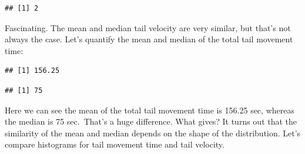 \documentclass[
]{book}
\newenvironment{Shaded}{\begin{snugshade}}{\end{snugshade}}
\newcommand{\AttributeTok}[1]{\textcolor[rgb]{0.13,0.29,0.53}{#1}}
\newcommand{\DecValTok}[1]{\textcolor[rgb]{0.00,0.00,0.81}{#1}}
\newcommand{\FunctionTok}[1]{\textcolor[rgb]{0.13,0.29,0.53}{\textbf{#1}}}
\newcommand{\NormalTok}[1]{#1}
\newcommand{\SpecialCharTok}[1]{\textcolor[rgb]{0.81,0.36,0.00}{\textbf{#1}}}
\newcommand{\StringTok}[1]{\textcolor[rgb]{0.31,0.60,0.02}{#1}}
\begin{document}
\begin{Shaded}
\end{Shaded}

\begin{verbatim}
## [1] 2
\end{verbatim}

Fascinating. The mean and median tail velocity are very similar, but that's not always the case. Let's quantify the mean and median of the total tail movement time:

\begin{Shaded}
\end{Shaded}

\begin{verbatim}
## [1] 156.25
\end{verbatim}

\begin{Shaded}
\end{Shaded}

\begin{verbatim}
## [1] 75
\end{verbatim}

Here we can see the mean of the total tail movement time is 156.25 sec, whereas the median is 75 sec.~That's a huge difference. What gives? It turns out that the similarity of the mean and median depends on the shape of the distribution. Let's compare histograms for tail movement time and tail velocity.

\begin{Shaded}
\end{Shaded}
\end{document}

